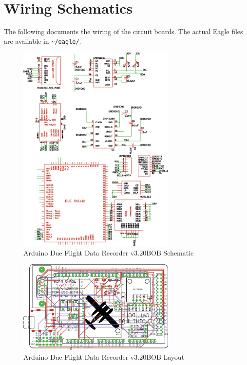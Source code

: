 \chapter{Wiring Schematics}
The following documents the wiring of the circuit boards. The actual Eagle files are available in \texttt{\textasciitilde/eagle/}.
\begin{figure}[h!]
  \caption{Arduino Due Flight Data Recorder v3.20BOB Schematic} \label{fig:thesisSchematic}
  \centering
    \includegraphics[width=0.7\textwidth]{figures/thesisSchematic.eps}
\end{figure}

\begin{figure}[h!]
  \caption{Arduino Due Flight Data Recorder v3.20BOB Layout} \label{fig:thesisBrd}
  \centering
    \includegraphics[width=0.7\textwidth]{figures/thesisBrd.eps}
\end{figure}


